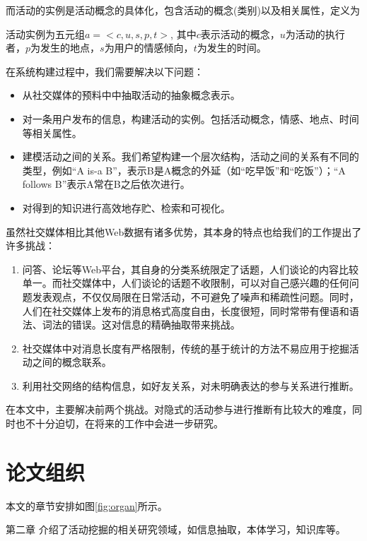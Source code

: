 而活动的实例是活动概念的具体化，包含活动的概念(类别)以及相关属性，定义为
\begin{definition}
活动实例为五元组$a=<c, u, s, p, t>$, 其中$c$表示活动的概念，$u$为活动的执行者，$p$为发生的地点，$s$为用户的情感倾向，$t$为发生的时间。
\end{definition}

在系统构建过程中，我们需要解决以下问题：

\begin{problem}[活动挖掘]
\begin{itemize}
\item 从社交媒体的预料中中抽取活动的抽象概念表示。
\item 对一条用户发布的信息，构建活动的实例。包括活动概念，情感、地点、时间等相关属性。
\item 建模活动之间的关系。我们希望构建一个层次结构，活动之间的关系有不同的类型，例如``A is-a B''，表示B是A概念的外延（如``吃早饭''和``吃饭''）；``A follows B''表示A常在B之后依次进行。
\item 对得到的知识进行高效地存贮、检索和可视化。
\end{itemize}
\end{problem}

虽然社交媒体相比其他Web数据有诸多优势，其本身的特点也给我们的工作提出了许多挑战：

\begin{enumerate}
\item 问答、论坛等Web平台，其自身的分类系统限定了话题，人们谈论的内容比较单一。而社交媒体中，人们谈论的话题不收限制，可以对自己感兴趣的任何问题发表观点，不仅仅局限在日常活动，不可避免了噪声和稀疏性问题。同时，人们在社交媒体上发布的消息格式高度自由，长度很短，同时常带有俚语和语法、词法的错误。这对信息的精确抽取带来挑战。
\item 社交媒体中对消息长度有严格限制，传统的基于统计的方法不易应用于挖掘活动之间的概念联系。
\item 利用社交网络的结构信息，如好友关系，对未明确表达的参与关系进行推断。
\end{enumerate}

在本文中，主要解决前两个挑战。对隐式的活动参与进行推断有比较大的难度，同时也不十分迫切，在将来的工作中会进一步研究。

\section{论文组织}
本文的章节安排如图\ref{fig:organ}所示。

{\heiti 第二章} 介绍了活动挖掘的相关研究领域，如信息抽取，本体学习，知识库等。

